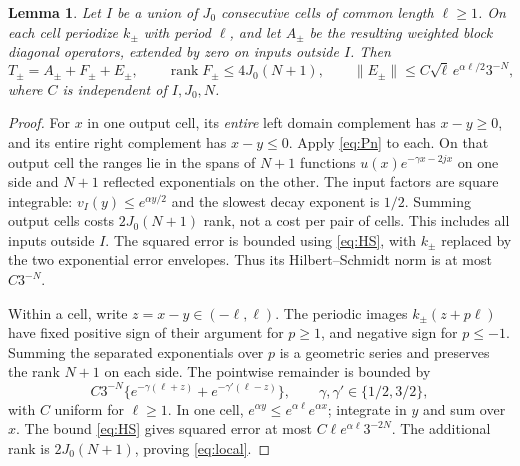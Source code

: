 \documentclass[11pt]{article}
\newtheorem{lemma}[theorem]{Lemma}
\numberwithin{equation}{section}
\newcommand{\rank}{\operatorname{rank}}
\begin{document}
\begin{lemma}\label{lem:local}
Let $I$ be a union of $J_0$ consecutive cells of common length
$\ell\ge1$. On each cell periodize $k_\pm$ with period $\ell$,
and let $A_\pm$ be the resulting weighted block diagonal operators,
extended by zero on inputs outside $I$. Then
\begin{equation}\label{eq:local}
 T_\pm=A_\pm+F_\pm+E_\pm,\qquad
 \rank F_\pm\le4J_0(N+1),\qquad
 \|E_\pm\|\le C\sqrt\ell\,e^{\alpha\ell/2}3^{-N},
\end{equation}
where $C$ is independent of $I,J_0,N$.
\end{lemma}
\begin{proof}
For $x$ in one output cell, its \emph{entire} left domain complement
has $x-y\ge0$, and its entire right complement has $x-y\le0$.
Apply \eqref{eq:Pn} to each. On that output cell the ranges lie in
the spans of $N+1$ functions $u(x)e^{-\gamma x-2jx}$ on one side
and $N+1$ reflected exponentials on the other. The input factors are
square integrable: $v_I(y)\le e^{\alpha y/2}$ and the slowest decay
exponent is $1/2$. Summing output cells costs $2J_0(N+1)$ rank,
not a cost per pair of cells. This includes all inputs outside $I$.
The squared error is bounded using \eqref{eq:HS}, with $k_\pm$
replaced by the two exponential error envelopes. Thus its
Hilbert--Schmidt norm is at most $C3^{-N}$.

Within a cell, write $z=x-y\in(-\ell,\ell)$. The periodic images
$k_\pm(z+p\ell)$ have fixed positive sign of their argument for
$p\ge1$, and negative sign for $p\le-1$. Summing the separated
exponentials over $p$ is a geometric series and preserves the rank
$N+1$ on each side. The pointwise remainder is bounded by
\[
 C3^{-N}\{e^{-\gamma(\ell+z)}+e^{-\gamma'(\ell-z)}\},
 \qquad \gamma,\gamma'\in\{1/2,3/2\},
\]
with $C$ uniform for $\ell\ge1$. In one cell,
$e^{\alpha y}\le e^{\alpha\ell}e^{\alpha x}$; integrate in $y$
and sum over $x$. The bound \eqref{eq:HS} gives squared error at most
$C\ell e^{\alpha\ell}3^{-2N}$. The additional rank is
$2J_0(N+1)$, proving \eqref{eq:local}.
\end{proof}
\end{document}
